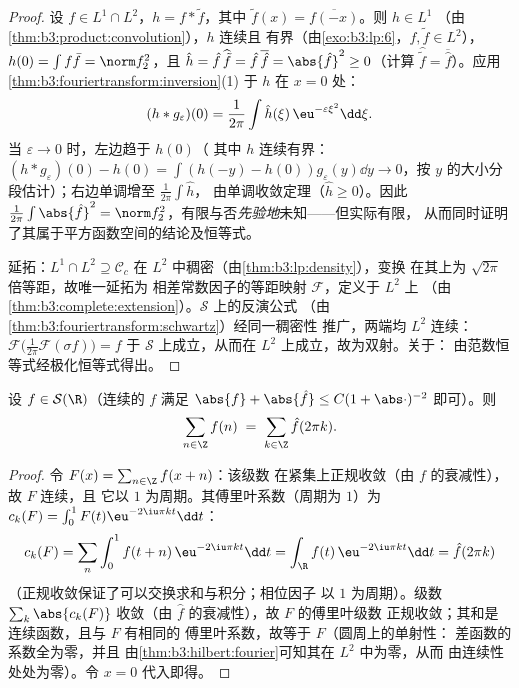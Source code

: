\begin{proof}
设 $f \in L^1\cap L^2$，$h = f * \tilde f$，其中
$\tilde f(x) = \overline{f(-x)}$。则 $h \in L^1$
（由\cref{thm:b3:product:convolution}），$h$ 连续且
有界（由\cref{exo:b3:lp:6}，$f, \tilde f \in L^2$），$h(0) =
\int f\bar f = \norm f_2^2$，且 $\hat h = \hat
f\,\widehat{\tilde f} = \hat f\,\overline{\hat f} =
\abs{\hat f}^2 \geq 0$（计算 $\widehat{\tilde f} =
\overline{\hat f}$）。应用
\cref{thm:b3:fouriertransform:inversion}(1) 于 $h$ 在 $x = 0$ 处：
\[
(h * g_\varepsilon)(0) = \frac1{2\pi}\int \hat
h(\xi)\,\eu^{-\varepsilon\xi^2}\dd\xi .
\]
当 $\varepsilon \to 0$ 时，左边趋于 $h(0)$（
其中 $h$ 连续有界：$(h*g_\varepsilon)(0) - h(0) = \int(h(-y)
- h(0))g_\varepsilon(y)\dd y \to 0$，按
$y$ 的大小分段估计）；右边单调增至 $\frac1{2\pi}\int\hat h$，
由单调收敛定理（$\hat h \geq 0$）。因此 $\frac1{2\pi}\int\abs{\hat f}^2 =
\norm f_2^2$，有限与否\emph{先验地}未知——但实际有限，
从而同时证明了其属于平方函数空间的结论及恒等式。

延拓：$L^1\cap L^2 \supseteq \mathcal C_c$ 在
$L^2$ 中稠密（由\cref{thm:b3:lp:density}），变换
在其上为 $\sqrt{2\pi}$ 倍等距，故唯一延拓为
相差常数因子的等距映射 $\mathcal F$，定义于 $L^2$ 上
（由\cref{thm:b3:complete:extension}）。$\mathcal S$ 上的反演公式
（由\cref{thm:b3:fouriertransform:schwartz}）经同一稠密性
推广，两端均 $L^2$ 连续：$\mathcal
F\bigl(\frac1{2\pi}\mathcal F(\sigma f)\bigr) = f$ 于
$\mathcal S$ 上成立，从而在 $L^2$ 上成立，故为双射。关于：
由范数恒等式经极化恒等式得出。
\end{proof}

\begin{theorem}[泊松求和公式]
\label{thm:b3:fouriertransform:poisson}
设 $f \in \mathcal S(\R)$（连续的 $f$ 满足 $\abs{f} +
\abs{\hat f} \leq C(1 + \abs\cdot)^{-2}$
即可）。则
\[
\sum_{n\in\Z} f(n) \;=\; \sum_{k\in\Z}\hat f(2\pi k) .
\]
\end{theorem}

\begin{proof}
令 $F(x) = \sum_{n\in\Z}f(x + n)$：该级数
在紧集上正规收敛（由 $f$ 的衰减性），故 $F$ 连续，且
它以 $1$ 为周期。其傅里叶系数（周期为 $1$）为
$c_k(F) = \int_0^1F(t)\eu^{-2\iu\pi kt}\dd t$：
\[
c_k(F) = \sum_n\int_0^1 f(t + n)\,\eu^{-2\iu\pi kt}\dd t
= \int_\R f(t)\,\eu^{-2\iu\pi kt}\dd t = \hat f(2\pi k)
\]
（正规收敛保证了可以交换求和与积分；相位因子
以 $1$ 为周期）。级数 $\sum_k\abs{c_k(F)}$
收敛（由 $\hat f$ 的衰减性），故 $F$ 的傅里叶级数
正规收敛；其和是连续函数，且与 $F$ 有相同的
傅里叶系数，故等于 $F$（圆周上的单射性：
差函数的系数全为零，并且
由\cref{thm:b3:hilbert:fourier}可知其在 $L^2$ 中为零，从而
由连续性处处为零）。令 $x = 0$ 代入即得。
\end{proof}

